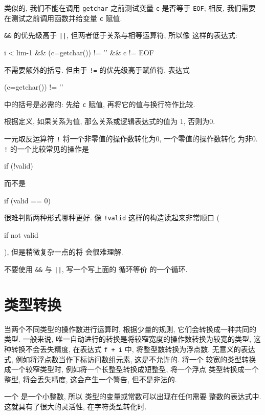 类似的, 我们不能在调用 \verb"getchar" 之前测试变量 \verb"c" 是否等于
\verb"EOF"; 相反, 我们需要在测试之前调用函数并给变量 \verb"c" 赋值.

\verb"&&" 的优先级高于 \verb"||", 但两者低于关系与相等运算符, 所以像
这样的表达式:
\begin{myverbatim}
    i < lim-1 && (c=getchar()) != '\n' && c != EOF 
\end{myverbatim}
不需要额外的括号. 但由于 \verb"!=" 的优先级高于赋值符, 表达式 
\begin{myverbatim}
    (c=getchar()) != '\n'
\end{myverbatim}
中的括号是必需的: 先给 \verb"c" 赋值, 再将它的值与换行符作比较.

根据定义, 如果关系为值, 那么关系或逻辑表达式的值为 1, 否则为0.

一元取反运算符 \verb"!" 将一个非零值的操作数转化为0, 一个零值的操作数转化
为非0. \verb"!" 的一个比较常见的操作是
\begin{myverbatim}
    if (!valid)
\end{myverbatim}
而不是
\begin{myverbatim}
    if (valid == 0)
\end{myverbatim}
很难判断两种形式哪种更好. 像 \verb"!valid" 这样的构造读起来非常顺口
(\begin{myquotation}if not valid\end{myquotation}), 但是稍微复杂一点的将
会很难理解.

\exercise 不要使用 \verb"&&" 与 \verb"||", 写一个写上面的 \cfor 循环等价
的一个循环.

\section{类型转换}
当两个不同类型的操作数进行运算时, 根据少量的规则, 它们会转换成一种共同的
类型. 一般来说, 唯一自动进行的转换是将较窄宽度的操作数转换为较宽的类型, 
这种转换不会丢失精度, 在表达式 \verb"f + i" 中, 将整型数转换为浮点数.
无意义的表达式, 例如将浮点数当作下标访问数组元素, 这是不允许的. 将一个 
较宽的类型转换成一个较窄类型时, 例如将一个长整型转换成短整型, 将一个浮点
类型转换成一个整型, 将会丢失精度, 这会产生一个警告, 但不是非法的.

一个 \cchar 是一个小整数, 所以 \cchar 类型的变量或常数可以出现在任何需要
整数的表达式中. 这就具有了很大的灵活性, 在字符类型转化时. 
